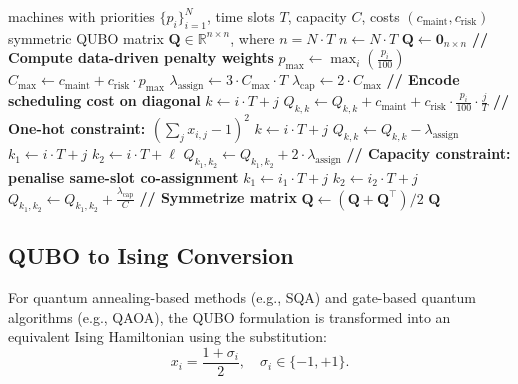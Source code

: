 \begin{algorithm}[htbp]
\small
\caption{Build QUBO Matrix for Scheduling}
\label{alg:build_qubo}
\begin{algorithmic}[1]
\Require machines with priorities $\{p_i\}_{i=1}^N$, time slots $T$, capacity $C$, costs $(c_{\text{maint}}, c_{\text{risk}})$
\Ensure symmetric QUBO matrix $\mathbf{Q} \in \mathbb{R}^{n \times n}$, where $n = N \cdot T$
\State $n \gets N \cdot T$
\State $\mathbf{Q} \gets \mathbf{0}_{n \times n}$
\Statex \textbf{// Compute data-driven penalty weights}
\State $p_{\max} \gets \max_i \left( \frac{p_i}{100} \right)$
\State $C_{\max} \gets c_{\text{maint}} + c_{\text{risk}} \cdot p_{\max}$
\State $\lambda_{\text{assign}} \gets 3 \cdot C_{\max} \cdot T$
\State $\lambda_{\text{cap}} \gets 2 \cdot C_{\max}$
\Statex \textbf{// Encode scheduling cost on diagonal}
        \State $k \gets i \cdot T + j$
        \State $Q_{k,k} \gets Q_{k,k} + c_{\text{maint}} + c_{\text{risk}} \cdot \frac{p_i}{100} \cdot \frac{j}{T}$
    \EndFor
\EndFor
\Statex \textbf{// One-hot constraint: $(\sum_j x_{i,j} - 1)^2$}
        \State $k \gets i \cdot T + j$
        \State $Q_{k,k} \gets Q_{k,k} - \lambda_{\text{assign}}$
    \EndFor
            \State $k_1 \gets i \cdot T + j$
            \State $k_2 \gets i \cdot T + \ell$
            \State $Q_{k_1,k_2} \gets Q_{k_1,k_2} + 2 \cdot \lambda_{\text{assign}}$
        \EndFor
    \EndFor
\EndFor
\Statex \textbf{// Capacity constraint: penalise same-slot co-assignment}
            \State $k_1 \gets i_1 \cdot T + j$
            \State $k_2 \gets i_2 \cdot T + j$
            \State $Q_{k_1,k_2} \gets Q_{k_1,k_2} + \frac{\lambda_{\text{cap}}}{C}$
        \EndFor
    \EndFor
\EndFor
\Statex \textbf{// Symmetrize matrix}
\State $\mathbf{Q} \gets (\mathbf{Q} + \mathbf{Q}^\top)/2$
\State \Return $\mathbf{Q}$
\end{algorithmic}
\end{algorithm}

\subsection{QUBO to Ising Conversion}
For quantum annealing-based methods (e.g., SQA) and gate-based quantum algorithms (e.g., QAOA), the QUBO formulation is transformed into an equivalent Ising Hamiltonian using the substitution:
\begin{equation}
x_i = \frac{1 + \sigma_i}{2}, \quad \sigma_i \in \{-1, +1\}.
\end{equation}

